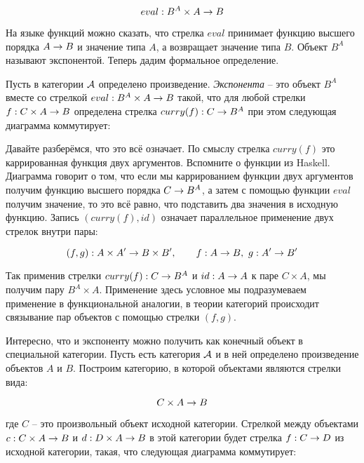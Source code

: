 \[eval : B^A \times A \rightarrow B\]

На языке функций можно сказать, что стрелка $eval$ принимает функцию
высшего порядка $A \rightarrow B$ и значение типа $A$, а возвращает значение
типа $B$. Объект $B^A$ называют экспонентой. Теперь дадим формальное
определение.

Пусть в категории $\mathcal{A}$ определено произведение. 
\emph{Экспонента} -- это объект $B^A$ вместе со стрелкой
$eval : B^A \times A \rightarrow B$ такой, что для любой стрелки
$f : C \times A \rightarrow B$ определена стрелка $curry(f):C \rightarrow B^A$ при этом
следующая диаграмма коммутирует:

\begin{centering}



\end{centering}

Давайте разберёмся, что это всё означает. По смыслу стрелка $curry(f)$
это каррированная функция двух аргументов. Вспомните о функции
 из Haskell. Диаграмма говорит о том, что если мы
каррированием функции двух аргументов получим функцию высшего порядка
$C \rightarrow B^A$, а затем с помощью функции $eval$ получим значение, то это
всё равно, что подставить два значения в исходную функцию. Запись
$(curry(f), id)$ означает параллельное применение двух стрелок внутри
пары:

\[(f, g) : A \times A' \rightarrow B \times B' 
            , \qquad f : A\rightarrow B , \ g : A' \rightarrow B'\]

Так применив стрелки $curry(f) : C \rightarrow B^A$ и $id : A \rightarrow A$ к паре
$C \times A$, мы получим пару $B^A \times A$. Применение здесь условное
мы подразумеваем применение в функциональной аналогии, в теории
категорий происходит связывание пар объектов с помощью стрелки $(f, g)$.

Интересно, что и экспоненту можно получить как конечный объект в
специальной категории. Пусть есть категория $\mathcal{A}$ и в ней определено
произведение объектов $A$ и $B$. Построим категорию, в которой объектами
являются стрелки вида:

\[C \times A \rightarrow B\]

\noindent 

где $C$ -- это произвольный объект исходной категории. Стрелкой между
объектами $c : C \times A \rightarrow B$ и $d : D \times A \rightarrow B$ в этой
категории будет стрелка $f : C \rightarrow D$ из исходной категории, такая, что
следующая диаграмма коммутирует:

\begin{centering}



\end{centering}

